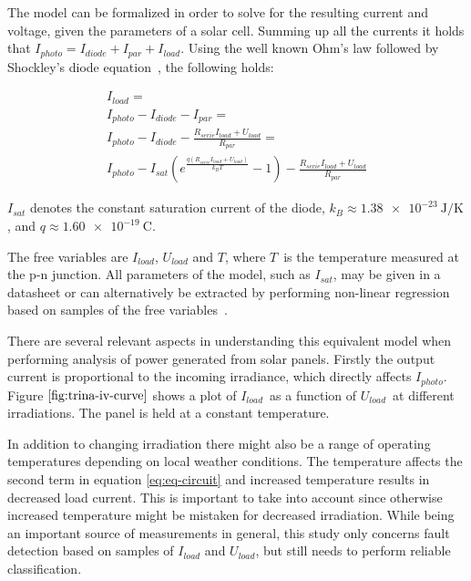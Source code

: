 \clearpage
The model can be formalized in order to solve for the resulting current and voltage, given the parameters of a solar cell.
Summing up all the currents it holds that $I_{photo} = I_{diode} + I_{par} + I_{load}$.
Using the well known Ohm's law followed by Shockley's diode equation~\cite{Walker2001}, the following holds:

\begin{multline}
\label{eq:eq-circuit}
I_{load} = \\
I_{photo} - I_{diode} - I_{par} = \\
I_{photo} - I_{diode} - \frac{R_{serie}I_{load} + U_{load}}{R_{par}} = \\
I_{photo} - I_{sat}(e^\frac{q(R_{serie}I_{load} + U_{load})}{k_B T} - 1) - \frac{R_{serie}I_{load} + U_{load}}{R_{par}}
\end{multline}

$I_{sat}$ denotes the constant saturation current of the diode,
$k_B \approx \SI{1.38e-23}{\joule\per\kelvin}$,
and $q \approx \SI{1.60e-19}{\coulomb}$.

The free variables are $I_{load}$, $U_{load}$ and $T$, where $T$ is the temperature measured at the p-n junction.
All parameters of the model, such as $I_{sat}$, may be given in a datasheet or can alternatively be extracted by performing non-linear regression based on samples of the free variables~\cite{Walker2001}.

There are several relevant aspects in understanding this equivalent model when performing analysis of power generated from solar panels.
Firstly the output current is proportional to the incoming irradiance, which directly affects $I_{photo}$.
Figure $\ref{fig:trina-iv-curve}$ shows a plot of $I_{load}$ as a function of $U_{load}$ at different irradiations.
The panel is held at a constant temperature.


In addition to changing irradiation there might also be a range of operating temperatures depending on local weather conditions.
The temperature affects the second term in equation \ref{eq:eq-circuit} and increased temperature results in decreased load current.
This is important to take into account since otherwise increased temperature might be mistaken for decreased irradiation.
While being an important source of measurements in general, this study only concerns fault detection based on samples of $I_{load}$ and $U_{load}$, but still needs to perform reliable classification.

